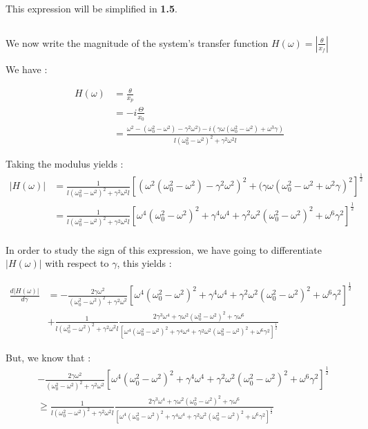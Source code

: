 \documentclass{article}
\begin{document}
This expression will be simplified in \textbf{1.5}.

\subsection{} %

We now write the magnitude of the system's transfer function $H(\omega) = \left|\frac{\theta}{x_f}\right|$

We have : 

\begin{align*}
H(\omega) &= \frac{\theta}{x_p}\\
&= -i\frac{\Theta}{x_0}\\
&= \frac{\omega^2-(\omega_0^2 -\omega^2) - \gamma^2\omega^2) - i(\gamma \omega(\omega_0^2-\omega^2)+ \omega^3\gamma)}{l(\omega_0^2 - \omega^2)^2 + \gamma^2\omega^2l} 
\end{align*}

Taking the modulus yields : 
\begin{align*}
\left|H(\omega)\right| &= \frac{1}{l(\omega_0^2-\omega^2)^2+\gamma^2\omega^2l}\left[(\omega^2(\omega_0^2-\omega^2)-\gamma^2\omega^2)^2 + (\gamma\omega(\omega_0^2-\omega^2+\omega^2\gamma)^2\right]^{\frac{1}{2}} \\
&= \frac{1}{l(\omega_0^2-\omega^2)^2+\gamma^2\omega^2l}\left[\omega^4(\omega_0^2-\omega^2)^2+\gamma^4\omega^4+\gamma^2\omega^2(\omega_0^2-\omega^2)^2+\omega^6\gamma^2\right]^{\frac{1}{2}} \\
\end{align*}

In order to study the sign of this expression, we have going to differentiate $\left|H(\omega)\right|$ with respect to $\gamma$, this yields :

\begin{align*}
\frac{d\left|H(\omega)\right|}{d\gamma} &= -\frac{2\gamma \omega^2}{(\omega_0^2-\omega^2)^2 + \gamma^2\omega^2}\left[\omega^4(\omega_0^2-\omega^2)^2+\gamma^4\omega^4+\gamma^2\omega^2(\omega_0^2-\omega^2)^2+\omega^6\gamma^2\right]^{\frac{1}{2}}\\ &+ \frac{1}{l(\omega_0^2-\omega^2)^2+\gamma^2\omega^2l}\frac{2\gamma^3\omega^4+\gamma \omega^2(\omega_0^2-\omega^2)^2+\gamma \omega^6}{\left[\omega^4(\omega_0^2-\omega^2)^2+\gamma^4\omega^4+\gamma^2\omega^2(\omega_0^2-\omega^2)^2+\omega^6\gamma^2\right]^{\frac{1}{2}}}
\end{align*}


But, we know that :
\begin{align*}
 & -\frac{2\gamma \omega^2}{(\omega_0^2-\omega^2)^2 + \gamma^2\omega^2}\left[\omega^4(\omega_0^2-\omega^2)^2+\gamma^4\omega^4+\gamma^2\omega^2(\omega_0^2-\omega^2)^2+\omega^6\gamma^2\right]^{\frac{1}{2}}\\
&\ge  \frac{1}{l(\omega_0^2-\omega^2)^2+\gamma^2\omega^2l}\frac{2\gamma^3\omega^4+\gamma \omega^2(\omega_0^2-\omega^2)^2+\gamma \omega^6}{\left[\omega^4(\omega_0^2-\omega^2)^2+\gamma^4\omega^4+\gamma^2\omega^2(\omega_0^2-\omega^2)^2+\omega^6\gamma^2\right]^{\frac{1}{2}}}
\end{align*}
\end{document}
